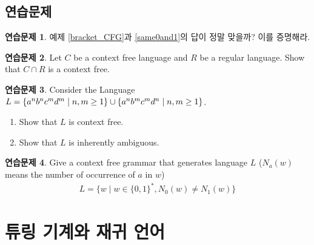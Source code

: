 \documentclass[b5paper, 11pt]{book}
\theoremstyle{definition}
\newtheorem{ec}{연습문제}[chapter]
\begin{document}
\section{연습문제}
\begin{ec}
    예제 \ref{bracket_CFG}과 \ref{same0and1}의 답이 정말 맞을까? 이를 증명해라.
\end{ec}
\begin{ec}
    Let $C$ be a context free language and $R$ be a regular language. Show that $C \cap R$ is a context free. 
\end{ec}
\begin{ec}
    Consider the Language $L = \{a^n b^n c^m d^m \;\vert\; n, m \ge 1\} \\ \cup \{a^n b^m c^m d^n \;\vert\; n,m \ge 1\}$.
    \begin{enumerate}
        \item Show that $L$ is context free.
        \item Show that $L$ is inherently ambiguous. 
    \end{enumerate}
\end{ec}
\begin{ec}
    Give a context free grammar that generates language $L$ ($N_a(w)$ means the number of occurrence of $a$ in $w$) 
    \begin{align*}
        L = \{ w \;\vert\; w \in \{0,1\}^*, N_0(w) \neq N_1(w) \}
    \end{align*}
\end{ec}
\chapter{튜링 기계와 재귀 언어} 
\end{document}
